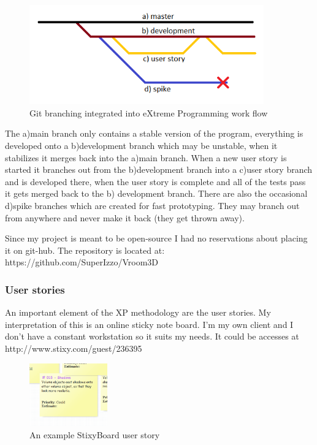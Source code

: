 \documentclass[11pt,fleqn,twoside]{article}
\begin{document}
\begin{figure}[h]
\centering
\includegraphics[width=0.9\textwidth]{git-XP-branches}
\caption{Git branching integrated into eXtreme Programming work flow}
\label{fig:gitXPbranches}
\end{figure}

The a)main branch  only contains a stable version of the program, everything is developed onto a b)development branch which may be unstable, when it stabilizes it merges back into the a)main branch. When a new user story is started it branches out from the b)development branch into a c)user story branch and is developed there, when the user story is complete and all of the tests pass it gets merged back to the b) development branch. There are also the occasional d)spike branches which are created for fast prototyping. They may branch out from anywhere and never make it back (they get thrown away).

Since my project is meant to be open-source I had no reservations about placing it on git-hub. The repository is located at: https://github.com/SuperIzzo/Vroom3D

\subsubsection{User stories}
An important element of the XP methodology are the user stories. My interpretation of this is an online sticky note board. I'm my own client and I don't have a constant workstation so it suits my needs. It could be accesses at http://www.stixy.com/guest/236395

\begin{figure}[htb]
\centering
\includegraphics[width=0.3\textwidth]{user-story}
\caption{An example StixyBoard user story}
\label{fig:stixyUserStory}
\end{figure}
\end{document}
